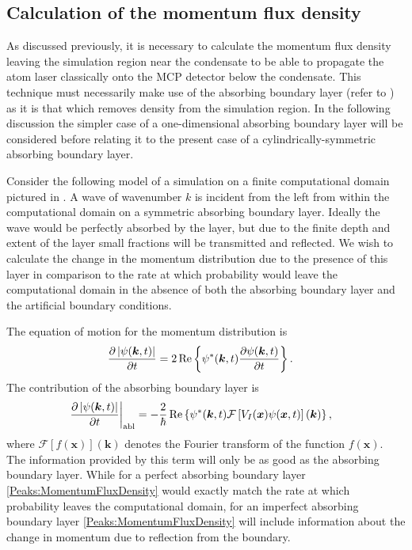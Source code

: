 \subsection{Calculation of the momentum flux density}
\label{Peaks:AbsorbingBoundaryTricks}

As discussed previously, it is necessary to calculate the momentum flux density leaving the simulation region near the condensate to be able to propagate the atom laser classically onto the MCP detector below the condensate. This technique must necessarily make use of the absorbing boundary layer (refer to ) as it is that which  removes density from the simulation region. In the following discussion the simpler case of a one-dimensional absorbing boundary layer will be considered before relating it to the present case of a cylindrically-symmetric absorbing boundary layer.

Consider the following model of a simulation on a finite computational domain pictured in . A wave of wavenumber $k$ is incident from the left from within the computational domain on a symmetric absorbing boundary layer. Ideally the wave would be perfectly absorbed by the layer, but due to the finite depth and extent of the layer small fractions will be transmitted and reflected. We wish to calculate the change in the momentum distribution due to the presence of this layer in comparison to the rate at which probability would leave the computational domain in the absence of both the absorbing boundary layer and the artificial boundary conditions.

The equation of motion for the momentum distribution is
\begin{align}
    \frac{\partial \left|\psi(\bm{k}, t)\right|}{\partial t} &= 2 \operatorname{Re}\left\{ \psi^*(\bm{k}, t) \frac{\partial \psi(\bm{k}, t)}{\partial t}\right\}.
\end{align}
The contribution of the absorbing boundary layer is
\begin{align}
    \label{Peaks:MomentumFluxDensity}
    \left.\frac{\partial \abs{\psi(\bm{k}, t)}}{\partial t} \right|_\text{abl}&=-\frac{2}{\hbar} \Re \left\{ \psi^*(\bm{k}, t) \mathcal{F}\left[ V_I(\bm{x}) \psi(\bm{x}, t)\right](\bm{k}) \right\},
\end{align}
where $\mathcal{F}[f(\bm{x})](\bm{k})$ denotes the Fourier transform of the function $f(\bm{x})$. The information provided by this term will only be as good as the absorbing boundary layer. While for a perfect absorbing boundary layer \eqref{Peaks:MomentumFluxDensity} would exactly match the rate at which probability leaves the computational domain, for an imperfect absorbing boundary layer \eqref{Peaks:MomentumFluxDensity} will include information about the change in momentum due to reflection from the boundary.


